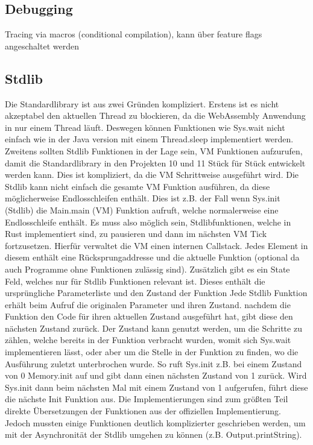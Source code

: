 \subsection{Debugging}
Tracing via macros (conditional compilation), kann über feature flags angeschaltet werden

\subsection{Stdlib}
Die Standardlibrary ist aus zwei Gründen kompliziert. Erstens ist es nicht akzeptabel den aktuellen Thread zu blockieren, da die WebAssembly Anwendung in nur einem Thread läuft. Deswegen können Funktionen wie Sys.wait nicht einfach wie in der Java version mit einem Thread.sleep implementiert werden.
Zweitens sollten Stdlib Funktionen in der Lage sein, VM Funktionen aufzurufen, damit die Standardlibrary in den Projekten 10 und 11 Stück für Stück entwickelt werden kann. Dies ist kompliziert, da die VM Schrittweise ausgeführt wird. Die Stdlib kann nicht einfach die gesamte VM Funktion ausführen, da diese möglicherweise Endlosschleifen enthält. Dies ist z.B. der Fall wenn Sys.init (Stdlib) die Main.main (VM) Funktion aufruft, welche normalerweise eine Endlosschleife enthält.
Es muss also möglich sein, Stdlibfunktionen, welche in Rust implementiert sind, zu pausieren und dann im nächsten VM Tick fortzusetzen.
Hierfür verwaltet die VM einen internen Callstack. Jedes Element in diesem enthält eine Rücksprungaddresse und die aktuelle Funktion (optional da auch Programme ohne Funktionen zulässig sind).
Zusätzlich gibt es ein State Feld, welches nur für Stdlib Funktionen relevant ist. Dieses enthält die ursprüngliche Parameterliste und den Zustand der Funktion
Jede Stdlib Funktion erhält beim Aufruf die originalen Parameter und ihren Zustand.
nachdem die Funktion den Code für ihren aktuellen Zustand ausgeführt hat, gibt diese den nächsten Zustand zurück.
Der Zustand kann genutzt werden, um die Schritte zu zählen, welche bereits in der Funktion verbracht wurden, womit sich Sys.wait implementieren lässt, oder aber um die Stelle in der Funktion zu finden, wo die Ausführung zuletzt unterbrochen wurde. So ruft Sys.init z.B. bei einem Zustand von 0 Memory.init auf und gibt dann einen nächsten Zustand von 1 zurück. Wird Sys.init dann beim nächsten Mal mit einem Zustand von 1 aufgerufen, führt diese die nächste Init Funktion aus.
Die Implementierungen sind zum größten Teil direkte Übersetzungen der Funktionen aus der offiziellen Implementierung. Jedoch mussten einige Funktionen deutlich komplizierter geschrieben werden, um mit der Asynchronität der Stdlib umgehen zu können (z.B. Output.printString).
